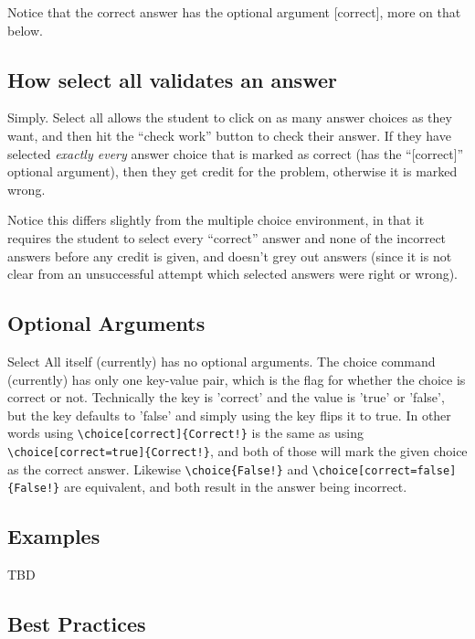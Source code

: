 \documentclass{ximera}
\begin{document}
        Notice that the correct answer has the optional argument [correct], more on that below.
            
            
        \subsection*{How select all validates an answer}
        
            Simply. Select all allows the student to click on as many answer choices as they want, and then hit the ``check work'' button to check their answer. If they have selected \textit{exactly every} answer choice that is marked as correct (has the ``[correct]'' optional argument), then they get credit for the problem, otherwise it is marked wrong. 
            
            Notice this differs slightly from the multiple choice environment, in that it requires the student to select every ``correct'' answer and none of the incorrect answers before any credit is given, and doesn't grey out answers (since it is not clear from an unsuccessful attempt which selected answers were right or wrong).
            
    \subsection*{Optional Arguments}
    
        Select All itself (currently) has no optional arguments. The choice command (currently) has only one key-value pair, which is the flag for whether the choice is correct or not. Technically the key is 'correct' and the value is 'true' or 'false', but the key defaults to 'false' and simply using the key flips it to true. In other words using \verb|\choice[correct]{Correct!}| is the same as using \verb|\choice[correct=true]{Correct!}|, and both of those will mark the given choice as the correct answer. Likewise \verb|\choice{False!}| and \verb|\choice[correct=false]{False!}| are equivalent, and both result in the answer being incorrect.
        
    \subsection*{Examples}
    
        TBD
        
    \subsection*{Best Practices}
    
\end{document}
